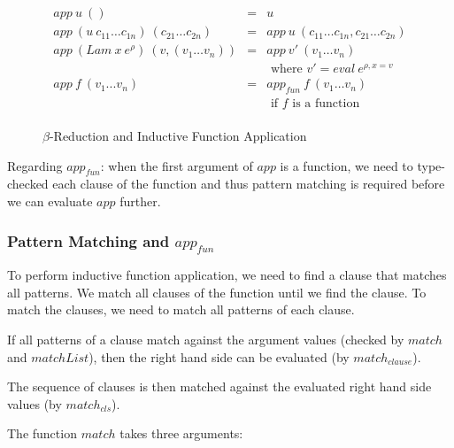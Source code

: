 \documentclass[acmsmall]{acmart}
\begin{document}
\begin{figure}[H]
  \begin{equation*}
    \begin{aligned}
      app \: u \: ()                                             & = & u                                                      \\
      app \: (u \: c_{11} \dots c_{1n}) \: (c_{21} \dots c_{2n}) & = & app \: u \: (c_{11} \dots c_{1n}, c_{21} \dots c_{2n}) \\
      app \: (Lam \: x \: e^{\rho}) \: (v,(v_1 \dots v_n))       & = & app \: v' \: (v_1 \dots v_n)                           \\
                                                                 &   & \textrm{ where } v' = eval \: e^{\rho,x=v}             \\
      app \: f \: (v_1 ... v_n)                                  & = & app_{fun} \: f \: (v_1 \dots v_n)                      \\
                                                                 &   & \textrm{ if } f \textrm{ is a function }               \\
    \end{aligned}
  \end{equation*}
  \caption{$\beta$-Reduction and Inductive Function Application}
\end{figure}

Regarding $app_{fun}$: when the first argument of $app$ is a function, we need to type-checked each
clause of the function and thus pattern matching is required before we can evaluate $app$ further.

\subsubsection{Pattern Matching and $app_{fun}$}

To perform inductive function application, we need to find a clause that matches all patterns. We match all clauses
of the function until we find the clause. To match the clauses, we need to match all patterns of
each clause. 

If all patterns of a clause match against the argument values (checked by $match$ and $matchList$), then
the right hand side can be evaluated (by $match_{clause}$). 

The sequence of clauses is then matched against the evaluated right hand side values (by $match_{cls}$).

The function $match$ takes three arguments:
\end{document}
